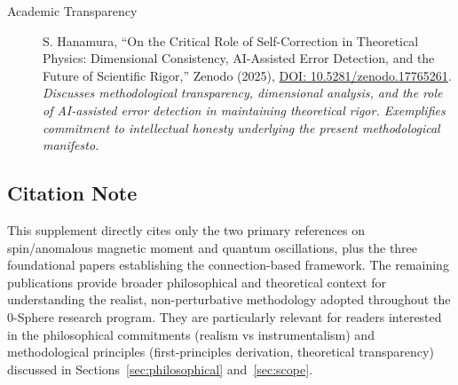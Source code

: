 \documentclass[12pt,letterpaper]{article}
\begin{document}
\begin{description}
\item[Academic Transparency] S. Hanamura, ``On the Critical Role of Self-Correction in Theoretical Physics: Dimensional Consistency, AI-Assisted Error Detection, and the Future of Scientific Rigor,'' Zenodo (2025), \href{https://doi.org/10.5281/zenodo.17765261}{DOI: 10.5281/zenodo.17765261}. \\
\textit{Discusses methodological transparency, dimensional analysis, and the role of AI-assisted error detection in maintaining theoretical rigor. Exemplifies commitment to intellectual honesty underlying the present methodological manifesto.}
\end{description}

\subsection*{Citation Note}

This supplement directly cites only the two primary references on spin/anomalous magnetic moment and quantum oscillations, plus the three foundational papers establishing the connection-based framework. The remaining publications provide broader philosophical and theoretical context for understanding the realist, non-perturbative methodology adopted throughout the 0-Sphere research program. They are particularly relevant for readers interested in the philosophical commitments (realism vs instrumentalism) and methodological principles (first-principles derivation, theoretical transparency) discussed in Sections~\ref{sec:philosophical} and~\ref{sec:scope}.

\end{document}
